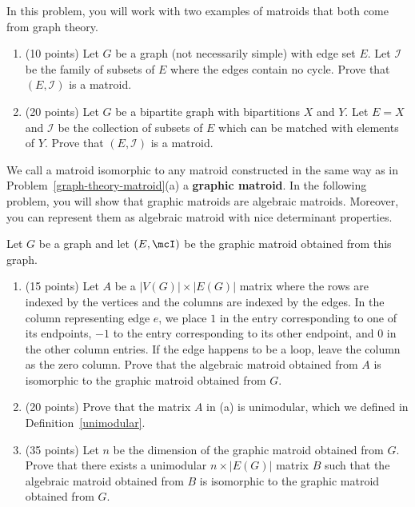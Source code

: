 \documentclass[11pt]{article}
\begin{document}
\begin{prob} \label{graph-theory-matroid}
    In this problem, you will work with two examples of matroids that both come from graph theory. 
    \begin{enumerate}[label = (\alph*)]
        \item (10 points) Let $G$ be a graph (not necessarily simple) with edge set $E$. Let $\mathcal{I}$ be the family of subsets of $E$ where the edges contain no cycle. Prove that $(E, \mathcal{I})$ is a matroid.
        \item (20 points) Let $G$ be a bipartite graph with bipartitions $X$ and $Y$. Let $E = X$ and $\mathcal{I}$ be the collection of subsets of $E$ which can be matched with elements of $Y$. Prove that $(E, \mathcal{I})$ is a matroid. 
    \end{enumerate}
\end{prob}

We call a matroid isomorphic to any matroid constructed in the same way as in Problem~\ref{graph-theory-matroid}(a) a \textbf{graphic matroid}. In the following problem, you will show that graphic matroids are algebraic matroids. Moreover, you can represent them as algebraic matroid with nice determinant properties. 

\begin{prob} [70 points]
    Let $G$ be a graph and let $(E, \mcI)$ be the graphic matroid obtained from this graph. 
    \begin{enumerate}[label = (\alph*)]
        \item (15 points) Let $A$ be a $|V(G)| \times |E(G)|$ matrix where the rows are indexed by the vertices and the columns are indexed by the edges. In the column representing edge $e$, we place $1$ in the entry corresponding to one of its endpoints, $-1$ to the entry corresponding to its other endpoint, and $0$ in the other column entries. If the edge happens to be a loop, leave the column as the zero column. Prove that the algebraic matroid obtained from $A$ is isomorphic to the graphic matroid obtained from $G$. 
        \item (20 points) Prove that the matrix $A$ in (a) is unimodular, which we defined in Definition~\ref{unimodular}.
        \item (35 points) Let $n$ be the dimension of the graphic matroid obtained from $G$. Prove that there exists a unimodular $n \times |E(G)|$ matrix $B$ such that the algebraic matroid obtained from $B$ is isomorphic to the graphic matroid obtained from $G$. 
    \end{enumerate}
\end{prob}
\end{document}
